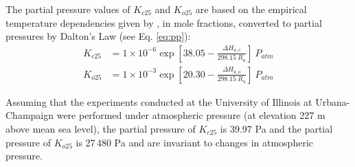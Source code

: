 The partial pressure values of $K_{c25}$ and $K_{o25}$ are based on the empirical temperature dependencies given by \cite{bernacchi01}, in mole fractions, converted to partial pressures by Dalton's Law (see Eq. \ref{eq:pp}):
%
%
\begin{subequations}
\label{eq:kcko25}
\begin{align}
	K_{c25}&=1\times 10^{-6} \exp \left[ 38.05 - 
    	\frac{\Delta H_{a,c}}{298.15\: R_{u}}
    \right]\: P_{atm} \label{eq:kc25} \\
    K_{o25}&=1\times 10^{-3} \exp \left[ 20.30 - 
    	\frac{\Delta H_{a,o}}{298.15\: R_{u}}
    \right]\: P_{atm} \label{eq:ko25}
\end{align}
\end{subequations}

\noindent Assuming that the experiments conducted at the University of Illinois at Urbana-Champaign were performed under atmospheric pressure (at elevation 227 m above mean sea level), the partial pressure of $K_{c25}$ is 39.97 Pa and the partial pressure of $K_{o25}$ is 27$\,$480 Pa and are invariant to changes in atmospheric pressure.

